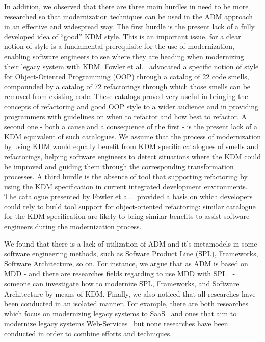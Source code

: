 In addition, we observed that there are three main hurdles in need to be more researched so that modernization techniques can be used in the ADM approach in an effective and widespread way. The first hurdle is the present lack of a fully developed idea of ``good'' KDM style. This is an important issue, for a clear notion of style is a fundamental prerequisite for the use of modernization, enabling software engineers to see where they are heading when modernizing their legacy system with KDM. Fowler et al.~\cite{refactImpro} advocated a specific notion of style for Object-Oriented Programming (OOP) through a catalog of 22 code smells, compounded by a catalog of 72 refactorings through which those smells can be removed from existing code. These catalogs proved very useful in bringing the concepts of refactoring and good OOP style to a wider audience and in providing programmers with guidelines on when to refactor and how best to refactor. A second one - both a cause and a consequence of the first - is the present lack of a KDM equivalent of such catalogues. We assume that the process of modernization by using KDM would equally benefit from KDM specific catalogues of smells and refactorings, helping software engineers to detect situations where the KDM could be improved and guiding them through the corresponding transformation processes. A third hurdle is the absence of tool that supporting refactoring by using the KDM specification in current integrated development environments. The catalogue presented by Fowler et al.~\cite{refactImpro} provided a basis on which developers could rely to build tool support for object-oriented refactoring: similar catalogue for the KDM specification are likely to bring similar benefits to assist software engineers during the modernization process.

We found that there is a lack of utilization of ADM and it's metamodels in some software engineering methods, such as Sofware Product Line (SPL), Frameworks, Software Architecture, so on. For instance, we argue that as ADM is based on MDD - and there are researches fields regarding to use MDD with SPL~\cite{4335247} - someone can investigate how to modernize SPL, Frameworks, and Software Architecture by means of KDM. Finally, we also noticed that all researches have been conducted in an isolated manner. For example, there are both researches which focus on modernizing legacy systems to SaaS~\cite{5741334, SMR:SMR582} and ones that aim to modernize legacy systems Web-Services~\cite{delCastillo:2009:PRP:1529282.1529753, ICEISPerez:CastilloGCP12} but none researches have been conducted in order to combine efforts and techniques.